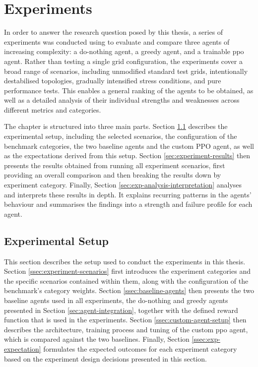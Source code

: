 \chapter{Experiments}\label{ch:experiments}
In order to answer the research question posed by this thesis, a series of experiments was conducted using \benchmark to evaluate and compare three agents of increasing complexity: a do-nothing agent, a greedy agent, and a trainable \ac{ppo} agent. Rather than testing a single grid configuration, the experiments cover a broad range of scenarios, including unmodified standard test grids, intentionally destabilised topologies, gradually intensified stress conditions, and pure performance tests. This enables a general ranking of the agents to be obtained, as well as a detailed analysis of their individual strengths and weaknesses across different metrics and categories.

The chapter is structured into three main parts. Section \ref{sec:experiment_setup} describes the experimental setup, including the selected scenarios, the configuration of the benchmark categories, the two baseline agents and the custom PPO agent, as well as the expectations derived from this setup. Section \ref{sec:experiment-results} then presents the results obtained from running all experiment scenarios, first providing an overall comparison and then breaking the results down by experiment category. Finally, Section \ref{sec:exp-analysis-interpretation} analyses and interprets these results in depth. It explains recurring patterns in the agents' behaviour and summarises the findings into a strength and failure profile for each agent.

\section{Experimental Setup}\label{sec:experiment_setup}
This section describes the setup used to conduct the experiments in this thesis. Section \ref{ssec:experiment-scenarios} first introduces the experiment categories and the specific scenarios contained within them, along with the configuration of the benchmark's category weights. Section \ref{ssec:baseline-agents} then presents the two baseline agents used in all experiments, the do-nothing and greedy agents presented in Section \ref{sec:agent-integration}, together with the defined reward function that is used in the experiments. Section \ref{ssec:custom-agent-setup} then describes the architecture, training process and tuning of the custom \ac{ppo} agent, which is compared against the two baselines. Finally, Section \ref{ssec:exp-expectation} formulates the expected outcomes for each experiment category based on the experiment design decisions presented in this section.

